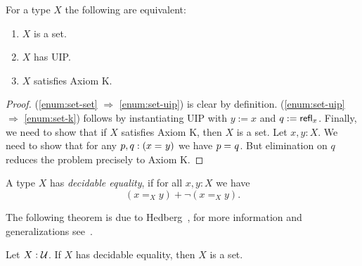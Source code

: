 \begin{thm}\label{thm:h-set-uip-K}
 For a type $X$ the following are equivalent:
 \begin{enumerate}
  \item\label{enum:set-set} $X$ is a set.
  \item\label{enum:set-uip} $X$ has UIP.
  \item\label{enum:set-k} $X$ satisfies Axiom K.
 \end{enumerate}
\end{thm}

\begin{proof} (\ref{enum:set-set} $\Rightarrow$ \ref{enum:set-uip}) is clear by definition. (\ref{enum:set-uip} $\Rightarrow$ \ref{enum:set-k}) follows by instantiating UIP with $y := x$ and $q := \mathsf{refl}_{x}$.
Finally, we need to show that if $X$ satisfies Axiom K, then $X$ is a set. Let $x, y : X$. We need to show that for any $p, q : (x =_{} y)$ we have $p =_{} q$. But elimination on $q$ reduces the problem precisely to Axiom K.
\end{proof}

\begin{defn}
 A type $X$ has {\em decidable equality}, if for all $x, y : X$ we have
 \[(x =_X y) + \neg (x =_X y).\]
\end{defn}

The following theorem is due to Hedberg~\cite{hedberg1998coherence}, for more information and generalizations
see~\cite{krausgeneralizations}.
\begin{thm}
 Let $X : \mathcal{U}$. If $X$ has decidable equality, then $X$ is a set.
\end{thm}

